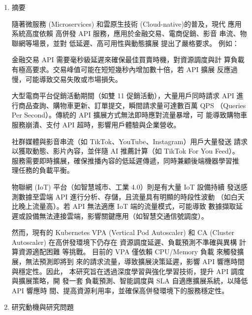 \documentclass[12pt,a4paper]{article}
\begin{document}
\setlength{\parindent}{2em}


\begin{enumerate}[label={(\zhdig*)}, leftmargin=2\parindent, listparindent=\parindent]

\item 摘要

    隨著微服務 (Microservices)
\cite{1}
和雲原生技術 (Cloud-native)\cite{2}的普及，現代
    應用系統高度依賴 高併發 API 服務，應用於金融交易、電商促銷、影音
    串流、物聯網等場景，並對 低延遲、高可用性與動態擴展 提出了嚴格要求。
    例如：

    金融交易 API 需要毫秒級延遲來確保最佳買賣時機，對資源調度與計
    算負載有極高要求。交易峰值可能在短短幾秒內增加數十倍，若 API 擴展
    反應過慢，可能導致交易失敗或市場損失。\cite{3}

    大型電商平台促銷活動期間（如雙 11 促銷活動），大量用戶同時請求
    API 進行商品查詢、購物車更新、訂單提交，瞬間請求量可達數百萬 QPS
    （Queries Per Second）。傳統的 API 擴展方式無法即時應對流量暴增，可
    能導致購物車服務崩潰、支付 API 超時，影響用戶體驗與企業營收。\cite{4}

    社群媒體與影音串流（如 TikTok、YouTube、Instagram）用戶大量發送
    請求以獲取動態、影片內容，並伴隨 AI 推薦計算（如 TikTok For You Feed）。
    服務需要即時擴展，確保推播內容的低延遲傳遞，同時兼顧後端機器學習推
    理任務的負載平衡。\cite{5}

    物聯網 (IoT) 平台（如智慧城市、工業 4.0）則是有大量 IoT 設備持續
    發送感測數據至雲端 API 進行分析、存儲，且流量具有明顯的時段性波動
    （如白天比晚上流量高）。若 API 無法適應 IoT 端的流量模式，可能導致
    數據擷取延遲或設備無法連接雲端，影響關鍵應用（如智慧交通信號調度）。
    \cite{6}

    然而，現有的 Kubernetes VPA (Vertical Pod Autoscaler) 和 CA (Cluster
    Autoscaler) 在高併發環境下仍存在 資源調度延遲、負載預測不準確與異構
    計算資源適配困難 等挑戰。
    目前的 VPA 僅依賴 CPU/Memory 負載 來觸發擴展，無法預測即將到
    來的請求流量，導致擴展決策延遲，影響 API 響應時間與穩定性。因此，
    本研究旨在透過深度學習與強化學習技術，提升 API 調度與擴展策略，開
    發一套 負載預測、智能調度與 SLA 自適應擴展系統，以降低 API 響應時
    間、提高資源利用率，並確保高併發環境下的服務穩定性。

\item 研究動機與研究問題\label{研究動機}

\begin{enumerate}[label={(\arabic*)}, leftmargin=\parindent, listparindent=\parindent]


\end{enumerate}
\end{enumerate}
\end{document}

